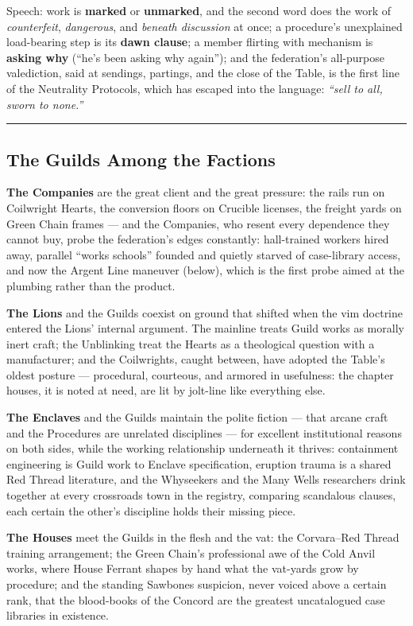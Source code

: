 Speech: work is \textbf{marked} or \textbf{unmarked}, and the second word does the work of \textit{counterfeit}, \textit{dangerous}, and \textit{beneath discussion} at once; a procedure's unexplained load-bearing step is its \textbf{dawn clause}; a member flirting with mechanism is \textbf{asking why} (``he's been asking why again''); and the federation's all-purpose valediction, said at sendings, partings, and the close of the Table, is the first line of the Neutrality Protocols, which has escaped into the language: \textit{``sell to all, sworn to none.''}

\medskip\hrule\medskip

\subsection{The Guilds Among the Factions}

\textbf{The Companies} are the great client and the great pressure: the rails run on Coilwright Hearts, the conversion floors on Crucible licenses, the freight yards on Green Chain frames --- and the Companies, who resent every dependence they cannot buy, probe the federation's edges constantly: hall-trained workers hired away, parallel ``works schools'' founded and quietly starved of case-library access, and now the Argent Line maneuver (below), which is the first probe aimed at the plumbing rather than the product.

\textbf{The Lions} and the Guilds coexist on ground that shifted when the vim doctrine entered the Lions' internal argument. The mainline treats Guild works as morally inert craft; the Unblinking treat the Hearts as a theological question with a manufacturer; and the Coilwrights, caught between, have adopted the Table's oldest posture --- procedural, courteous, and armored in usefulness: the chapter houses, it is noted at need, are lit by jolt-line like everything else.

\textbf{The Enclaves} and the Guilds maintain the polite fiction --- that arcane craft and the Procedures are unrelated disciplines --- for excellent institutional reasons on both sides, while the working relationship underneath it thrives: containment engineering is Guild work to Enclave specification, eruption trauma is a shared Red Thread literature, and the Whyseekers and the Many Wells researchers drink together at every crossroads town in the registry, comparing scandalous clauses, each certain the other's discipline holds their missing piece.

\textbf{The Houses} meet the Guilds in the flesh and the vat: the Corvara--Red Thread training arrangement; the Green Chain's professional awe of the Cold Anvil works, where House Ferrant shapes by hand what the vat-yards grow by procedure; and the standing Sawbones suspicion, never voiced above a certain rank, that the blood-books of the Concord are the greatest uncatalogued case libraries in existence.

